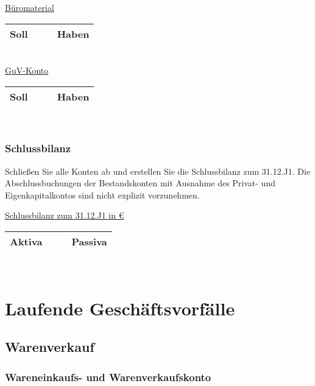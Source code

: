\documentclass[paper=a4, fontsize=11pt]{scrartcl}
\numberwithin{equation}{section}
\numberwithin{figure}{section}
\numberwithin{table}{section}
\begin{document}
\underline{Büromaterial}

\begin{tabular}{cc|cc}
\hline
Soll & & & Haben \\
\hline
\end{tabular}
\\

\underline{GuV-Konto}

\begin{tabular}{cc|cc}
\hline
Soll & & & Haben \\
\hline
\end{tabular}
\\


\subsubsection{Schlussbilanz}

Schließen Sie alle Konten ab und erstellen Sie die Schlussbilanz zum 31.12.J1. Die Abschlussbuchungen der Bestandskonten mit Ausnahme des Privat- und Eigenkapitalkontos sind nicht explizit vorzunehmen.

\underline{Schlussbilanz zum 31.12.J1 in €}

\begin{tabular}{cc|cc}
\hline
Aktiva & & & Passiva \\
\hline
\end{tabular}
\\


\section{Laufende Geschäftsvorfälle}


\subsection{Warenverkauf}


\subsubsection{Wareneinkaufs- und Warenverkaufskonto}
\end{document}
